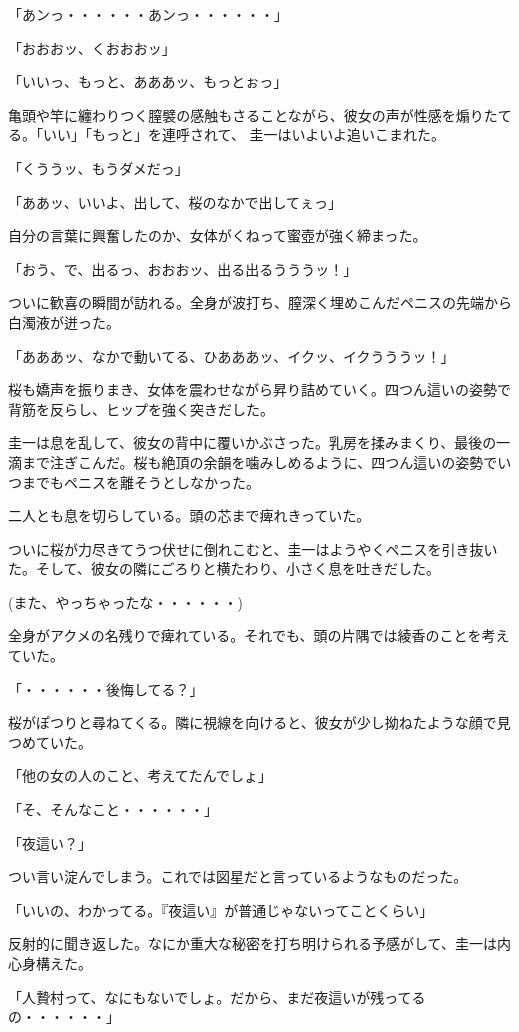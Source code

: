 ﻿\documentclass[book,tate]{jlreq}
\begin{document}
「あンっ・・・・・・あンっ・・・・・・」

「おおおッ、くおおおッ」

「いいっ、もっと、あああッ、もっとぉっ」

亀頭や竿に纏わりつく膣襞の感触もさることながら、彼女の声が性感を煽りたてる。「いい」「もっと」を連呼されて、 圭一はいよいよ追いこまれた。

「くううッ、もうダメだっ」

「ああッ、いいよ、出して、桜のなかで出してぇっ」

自分の言葉に興奮したのか、女体がくねって蜜壺が強く締まった。

「おう、で、出るっ、おおおッ、出る出るうううッ！」

ついに歓喜の瞬間が訪れる。全身が波打ち、膣深く埋めこんだペニスの先端から白濁液が迸った。

「あああッ、なかで動いてる、ひあああッ、イクッ、イクうううッ！」

桜も嬌声を振りまき、女体を震わせながら昇り詰めていく。四つん這いの姿勢で背筋を反らし、ヒップを強く突きだした。

圭一は息を乱して、彼女の背中に覆いかぶさった。乳房を揉みまくり、最後の一滴まで注ぎこんだ。桜も絶頂の余韻を噛みしめるように、四つん這いの姿勢でいつまでもペニスを離そうとしなかった。

二人とも息を切らしている。頭の芯まで痺れきっていた。

ついに桜が力尽きてうつ伏せに倒れこむと、圭一はようやくペニスを引き抜いた。そして、彼女の隣にごろりと横たわり、小さく息を吐きだした。

(また、やっちゃったな・・・・・・)

全身がアクメの名残りで痺れている。それでも、頭の片隅では綾香のことを考えていた。

「・・・・・・後悔してる？」

桜がぽつりと尋ねてくる。隣に視線を向けると、彼女が少し拗ねたような顔で見つめていた。

「他の女の人のこと、考えてたんでしょ」

「そ、そんなこと・・・・・・」

「夜這い？」

つい言い淀んでしまう。これでは図星だと言っているようなものだった。

「いいの、わかってる。『夜這い』が普通じゃないってことくらい」

反射的に聞き返した。なにか重大な秘密を打ち明けられる予感がして、圭一は内心身構えた。

「人贄村って、なにもないでしょ。だから、まだ夜這いが残ってるの・・・・・・」
\end{document}
